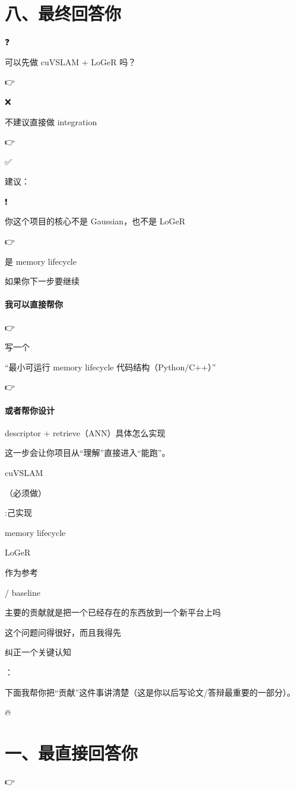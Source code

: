 \documentclass[12pt]{article}
\begin{document}
\section{八、最终回答你}
❓

可以先做 cuVSLAM + LoGeR 吗？

👉

❌

不建议直接做 integration

👉

✅

建议：

❗

你这个项目的核心不是 Gaussian，也不是 LoGeR

👉

是 memory lifecycle

如果你下一步要继续

\paragraph{我可以直接帮你}
👉

写一个

“最小可运行 memory lifecycle 代码结构（Python/C++）”

👉

\paragraph{或者帮你设计}
descriptor + retrieve（ANN）具体怎么实现

这一步会让你项目从“理解”直接进入“能跑”。

cuVSLAM

（必须做）

:⼰实现

memory lifecycle

LoGeR

作为参考

/ baseline

主要的贡献就是把一个已经存在的东西放到一个新平台上吗

这个问题问得很好，而且我得先

纠正一个关键认知

：

下面我帮你把“贡献”这件事讲清楚（这是你以后写论文/答辩最重要的一部分）。

🔥

\section{一、最直接回答你}
👉
\end{document}
